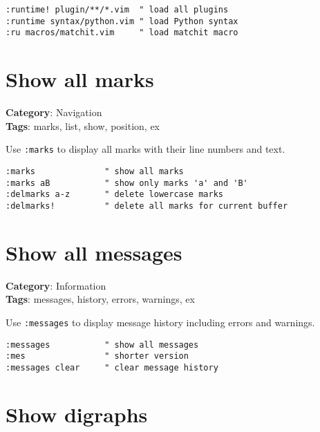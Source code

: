 {{{{{{\begin{Exa*}{}
\begin{Verbatim}[fontsize=\footnotesize, breaklines, breakanywhere]
:runtime! plugin/**/*.vim  " load all plugins
:runtime syntax/python.vim " load Python syntax
:ru macros/matchit.vim     " load matchit macro
\end{Verbatim}
\end{Exa*}

\section{Show all marks}

\textbf{Category}: Navigation\\ \textbf{Tags}: marks, list, show, position, ex
\vspace{0.5cm}

Use {\footnotesize \Verb§:marks§} to display all marks with their line numbers and text.

\begin{Exa*}{}
\begin{Verbatim}[fontsize=\footnotesize, breaklines, breakanywhere]
:marks              " show all marks
:marks aB           " show only marks 'a' and 'B'
:delmarks a-z       " delete lowercase marks
:delmarks!          " delete all marks for current buffer
\end{Verbatim}
\end{Exa*}

\section{Show all messages}

\textbf{Category}: Information\\ \textbf{Tags}: messages, history, errors, warnings, ex
\vspace{0.5cm}

Use {\footnotesize \Verb§:messages§} to display message history including errors and warnings.

\begin{Exa*}{}
\begin{Verbatim}[fontsize=\footnotesize, breaklines, breakanywhere]
:messages           " show all messages
:mes                " shorter version
:messages clear     " clear message history
\end{Verbatim}
\end{Exa*}

\section{Show digraphs}

}}}}}}
